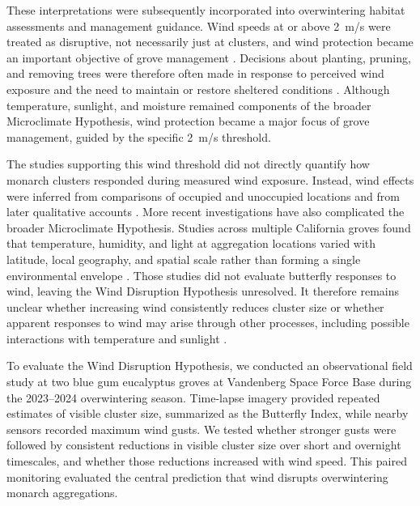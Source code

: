 \documentclass[insects,article,submit,pdftex,moreauthors]{Definitions/mdpi}
\begin{document}
These interpretations were subsequently incorporated into overwintering habitat assessments and management guidance. Wind speeds at or above 2~m/s were treated as disruptive, not necessarily just at clusters, and wind protection became an important objective of grove management \cite{leongEvaluationManagementCalifornia2016,jepsenProtectingCaliforniasButterfly2017,xercessocietyManagingMonarchsWest2018}. Decisions about planting, pruning, and removing trees were therefore often made in response to perceived wind exposure and the need to maintain or restore sheltered conditions \cite{weissRecommendationsRestorationMonarch2008,peltonMonarchButterflyOverwintering2020,althouse&meadeinc.EllwoodMesaSperling2023}. Although temperature, sunlight, and moisture remained components of the broader Microclimate Hypothesis, wind protection became a major focus of grove management, guided by the specific 2~m/s threshold.

The studies supporting this wind threshold did not directly quantify how monarch clusters responded during measured wind exposure. Instead, wind effects were inferred from comparisons of occupied and unoccupied locations and from later qualitative accounts \cite{leongMicroenvironmentalFactorsAssociated1990,leongUseMultivariateAnalyses1991,leongRestorationOverwinteringGrove1999}. More recent investigations have also complicated the broader Microclimate Hypothesis. Studies across multiple California groves found that temperature, humidity, and light at aggregation locations varied with latitude, local geography, and spatial scale rather than forming a single environmental envelope \cite{sanieeHierarchyScaleInfluence2022,fisherMultiScaleSpeciesDistribution2024}. Those studies did not evaluate butterfly responses to wind, leaving the Wind Disruption Hypothesis unresolved. It therefore remains unclear whether increasing wind consistently reduces cluster size or whether apparent responses to wind may arise through other processes, including possible interactions with temperature and sunlight \cite{mastersMonarchButterflyDanaus1988,kammerThoracicTemperatureShivering1970,barkerEffectPhotoperiodTemperature1976}.

To evaluate the Wind Disruption Hypothesis, we conducted an observational field study at two blue gum eucalyptus groves at Vandenberg Space Force Base during the 2023--2024 overwintering season. Time-lapse imagery provided repeated estimates of visible cluster size, summarized as the Butterfly Index, while nearby sensors recorded maximum wind gusts. We tested whether stronger gusts were followed by consistent reductions in visible cluster size over short and overnight timescales, and whether those reductions increased with wind speed. This paired monitoring evaluated the central prediction that wind disrupts overwintering monarch aggregations.
\end{document}
